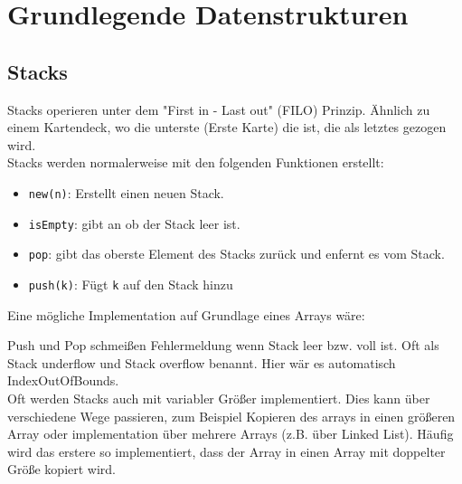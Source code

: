 \documentclass[
../../AuD-Zusammenfassung.tex,
]
{subfiles}
\begin{document}
\section{Grundlegende Datenstrukturen}
\subsection{Stacks}
Stacks operieren unter dem "First in - Last out" (FILO) Prinzip. Ähnlich zu einem Kartendeck, wo die unterste (Erste Karte) die ist, die als letztes gezogen wird. \\
Stacks werden normalerweise mit den folgenden Funktionen erstellt:
\begin{itemize}
    \item \texttt{new(n)}: Erstellt einen neuen Stack.
    \item \texttt{isEmpty}: gibt an ob der Stack leer ist.
    \item \texttt{pop}: gibt das oberste Element des Stacks zurück und enfernt es vom Stack.
    \item \texttt{push(k)}: Fügt \texttt{k} auf den Stack hinzu
\end{itemize}
Eine mögliche Implementation auf Grundlage eines Arrays wäre:


Push und Pop schmeißen Fehlermeldung wenn Stack leer bzw. voll ist. Oft als Stack underflow und Stack overflow benannt. Hier wär es automatisch IndexOutOfBounds.\\ Oft werden Stacks auch mit variabler Größer implementiert. Dies kann über verschiedene Wege passieren, zum Beispiel Kopieren des arrays in einen größeren Array oder implementation über mehrere Arrays (z.B. über Linked List). Häufig wird das erstere so implementiert, dass der Array in einen Array mit doppelter Größe kopiert wird.
\end{document}
